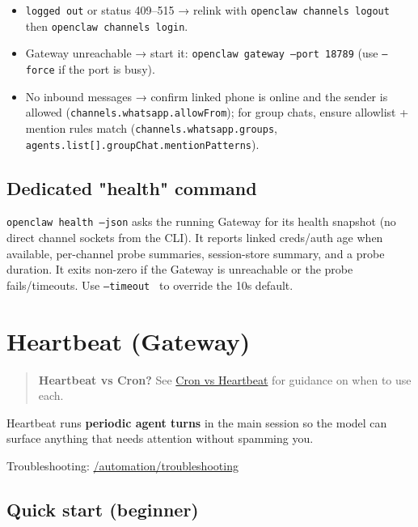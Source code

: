 \begin{itemize}
  \item \texttt{logged out} or status 409–515 → relink with \texttt{openclaw channels logout} then \texttt{openclaw channels login}.
  \item Gateway unreachable → start it: \texttt{openclaw gateway --port 18789} (use \texttt{--force} if the port is busy).
  \item No inbound messages → confirm linked phone is online and the sender is allowed (\texttt{channels.whatsapp.allowFrom}); for group chats, ensure allowlist + mention rules match (\texttt{channels.whatsapp.groups}, \texttt{agents.list[].groupChat.mentionPatterns}).
\end{itemize}


\subsection{Dedicated "health" command}


\texttt{openclaw health --json} asks the running Gateway for its health snapshot (no direct channel sockets from the CLI). It reports linked creds/auth age when available, per-channel probe summaries, session-store summary, and a probe duration. It exits non-zero if the Gateway is unreachable or the probe fails/timeouts. Use \texttt{--timeout } to override the 10s default.


\clearpage

\section{Heartbeat (Gateway)}


\begin{quote}
\textbf{Heartbeat vs Cron?} See \href{/automation/cron-vs-heartbeat}{Cron vs Heartbeat} for guidance on when to use each.
\end{quote}


Heartbeat runs \textbf{periodic agent turns} in the main session so the model can
surface anything that needs attention without spamming you.

Troubleshooting: \href{/automation/troubleshooting}{/automation/troubleshooting}

\subsection{Quick start (beginner)}


